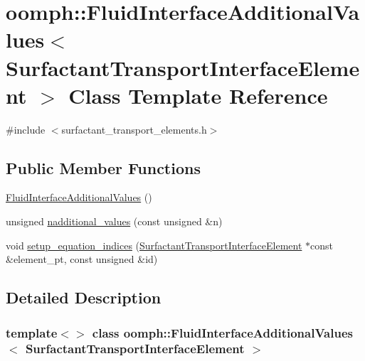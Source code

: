 \hypertarget{classoomph_1_1FluidInterfaceAdditionalValues_3_01SurfactantTransportInterfaceElement_01_4}{}\section{oomph\+:\+:Fluid\+Interface\+Additional\+Values$<$ Surfactant\+Transport\+Interface\+Element $>$ Class Template Reference}
\label{classoomph_1_1FluidInterfaceAdditionalValues_3_01SurfactantTransportInterfaceElement_01_4}


{\ttfamily \#include $<$surfactant\+\_\+transport\+\_\+elements.\+h$>$}

\subsection*{Public Member Functions}
\begin{DoxyCompactItemize}
\item 
\hyperlink{classoomph_1_1FluidInterfaceAdditionalValues_3_01SurfactantTransportInterfaceElement_01_4_aff7c8643ad9a5c817d99afa3dc48f701}{Fluid\+Interface\+Additional\+Values} ()
\item 
unsigned \hyperlink{classoomph_1_1FluidInterfaceAdditionalValues_3_01SurfactantTransportInterfaceElement_01_4_abeaecc53e255bf92f6cb8570400da979}{nadditional\+\_\+values} (const unsigned \&n)
\item 
void \hyperlink{classoomph_1_1FluidInterfaceAdditionalValues_3_01SurfactantTransportInterfaceElement_01_4_aa438b01934eb2f1a94c9bfba792e35fe}{setup\+\_\+equation\+\_\+indices} (\hyperlink{classoomph_1_1SurfactantTransportInterfaceElement}{Surfactant\+Transport\+Interface\+Element} $\ast$const \&element\+\_\+pt, const unsigned \&id)
\end{DoxyCompactItemize}


\subsection{Detailed Description}
\subsubsection*{template$<$$>$\newline
class oomph\+::\+Fluid\+Interface\+Additional\+Values$<$ Surfactant\+Transport\+Interface\+Element $>$}

